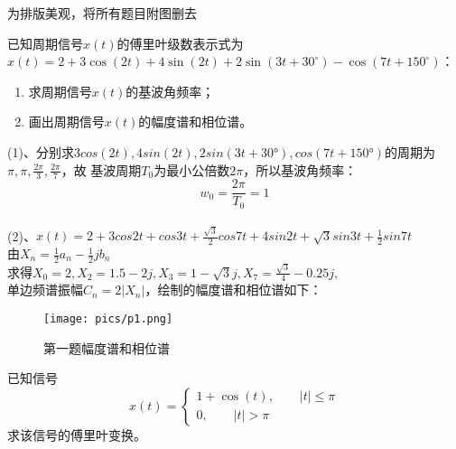 \documentclass[answers]{exam}  %
\begin{document}
\Large


{\color{red} 为排版美观，将所有题目附图删去}
\begin{questions}
	
\question 已知周期信号$x(t)$的傅里叶级数表示式为$x(t) = 2 + 3\cos(2t) + 4\sin(2t) + 2\sin(3t + 30^{\circ}) - \cos(7t + 150^{\circ})$：

\begin{enumerate}[(1)]
	\item 求周期信号$x(t)$的基波角频率；
	\item 画出周期信号$x(t)$的幅度谱和相位谱。
\end{enumerate}

\begin{solution}
	(1)、分别求$3cos(2t),4sin(2t),2sin(3t+30°),cos(7t+150°)$的周期为$\pi,\pi,\frac{2\pi}{3},\frac{2\pi}{7}$，故
	基波周期$T_0$为最小公倍数$2\pi$，所以基波角频率：$$w_0=\frac{2\pi}{T_0}=1$$\\
	(2)、$x(t)=2+3cos2t+cos3t+\frac{\sqrt{3}}{2}cos7t+4sin2t+\sqrt{3}sin3t+\frac{1}{2}sin7t$\\
	由$X_n=\frac{1}{2}a_n-\frac{1}{2}jb_n$\\
	求得$X_0=2,X_2=1.5-2j,X_3=1-\sqrt{3}j,X_7=\frac{\sqrt{3}}{4}-0.25j,$\\$\mbox{单边频谱振幅}C_n=2|X_n|$，绘制的幅度谱和相位谱如下：\\
\end{solution}

\begin{figure}[h]
	\centering
	\texttt{[image: pics/p1.png]}
	\caption{第一题幅度谱和相位谱}
\end{figure}
\question 已知信号
\begin{equation}
	\nonumber
	x(t) = 
	\begin{cases}
		1 + \cos(t), \qquad |t| \leq \pi \\
		0, \qquad |t| > \pi
	\end{cases}	
\end{equation}
求该信号的傅里叶变换。


\end{questions}
\end{document}
